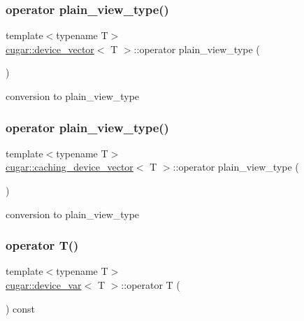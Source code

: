 \subsubsection{\texorpdfstring{operator plain\+\_\+view\+\_\+type()}{operator plain\_view\_type()}\hspace{0.1cm}{\footnotesize\ttfamily [4/5]}}
{\footnotesize\ttfamily template$<$typename T$>$ \\
\hyperlink{structcugar_1_1device__vector}{cugar\+::device\+\_\+vector}$<$ T $>$\+::operator plain\+\_\+view\+\_\+type (\begin{DoxyParamCaption}{ }\end{DoxyParamCaption})\hspace{0.3cm}{\ttfamily [inline]}}

conversion to plain\+\_\+view\+\_\+type \mbox{\label{group___basic_ga88dd1949f9871da3aa4d4aefd0167c8b}} 
\subsubsection{\texorpdfstring{operator plain\+\_\+view\+\_\+type()}{operator plain\_view\_type()}\hspace{0.1cm}{\footnotesize\ttfamily [5/5]}}
{\footnotesize\ttfamily template$<$typename T$>$ \\
\hyperlink{structcugar_1_1caching__device__vector}{cugar\+::caching\+\_\+device\+\_\+vector}$<$ T $>$\+::operator plain\+\_\+view\+\_\+type (\begin{DoxyParamCaption}{ }\end{DoxyParamCaption})\hspace{0.3cm}{\ttfamily [inline]}}

conversion to plain\+\_\+view\+\_\+type \mbox{\label{group___basic_ga64fde1bca016dd1b07ef0e7d6ef853ab}} 
\subsubsection{\texorpdfstring{operator T()}{operator T()}}
{\footnotesize\ttfamily template$<$typename T$>$ \\
\hyperlink{structcugar_1_1device__var}{cugar\+::device\+\_\+var}$<$ T $>$\+::operator T (\begin{DoxyParamCaption}{ }\end{DoxyParamCaption}) const\hspace{0.3cm}{\ttfamily [inline]}}

